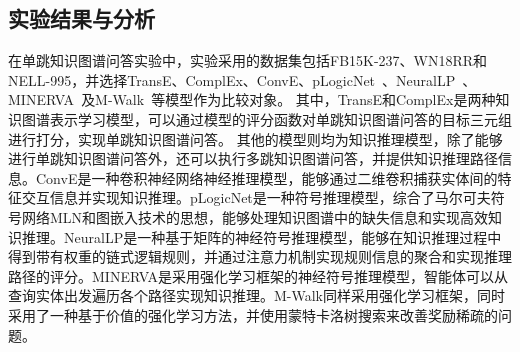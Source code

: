\documentclass[algorithmlist, AutoFakeBold, AutoFakeSlant, figurelist, tablelist, nomlist, engineering]{seuthesix}
\begin{document}
\subsection{实验结果与分析}
在单跳知识图谱问答实验中，实验采用的数据集包括FB15K-237、WN18RR和NELL-995，并选择TransE、ComplEx、ConvE、pLogicNet~\cite{qu2019probabilistic}、NeuralLP~\cite{yang2017differentiable}、MINERVA~\cite{das2018go}及M-Walk~\cite{shen2018m}等模型作为比较对象。
其中，TransE和ComplEx是两种知识图谱表示学习模型，可以通过模型的评分函数对单跳知识图谱问答的目标三元组进行打分，实现单跳知识图谱问答。
其他的模型则均为知识推理模型，除了能够进行单跳知识图谱问答外，还可以执行多跳知识图谱问答，并提供知识推理路径信息。ConvE是一种卷积神经网络神经推理模型，能够通过二维卷积捕获实体间的特征交互信息并实现知识推理。pLogicNet是一种符号推理模型，综合了马尔可夫符号网络MLN和图嵌入技术的思想，能够处理知识图谱中的缺失信息和实现高效知识推理。NeuralLP是一种基于矩阵的神经符号推理模型，能够在知识推理过程中得到带有权重的链式逻辑规则，并通过注意力机制实现规则信息的聚合和实现推理路径的评分。MINERVA是采用强化学习框架的神经符号推理模型，智能体可以从查询实体出发遍历各个路径实现知识推理。M-Walk同样采用强化学习框架，同时采用了一种基于价值的强化学习方法，并使用蒙特卡洛树搜索来改善奖励稀疏的问题。
\end{document}
